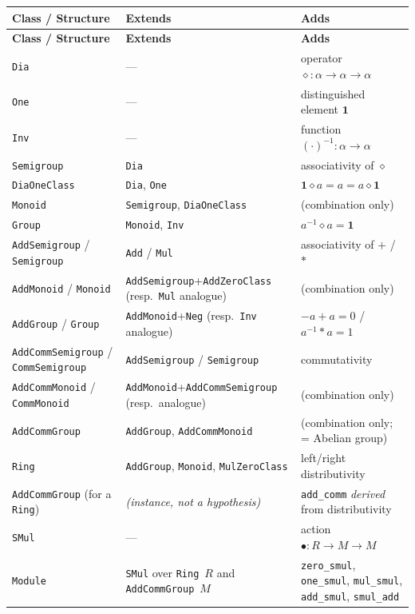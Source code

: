 \documentclass[11pt]{article}
\begin{document}
\begin{longtable}{@{}p{3.1cm}p{4.6cm}p{6.3cm}@{}}
\toprule
\textbf{Class / Structure} & \textbf{Extends} & \textbf{Adds} \\
\midrule
\endfirsthead
\toprule
\textbf{Class / Structure} & \textbf{Extends} & \textbf{Adds} \\
\midrule
\endhead
\texttt{Dia} & --- & operator $\diamond:\alpha\to\alpha\to\alpha$ \\
\texttt{One} & --- & distinguished element $\mathbf{1}$ \\
\texttt{Inv} & --- & function $(\cdot)^{-1}:\alpha\to\alpha$ \\
\texttt{Semigroup} & \texttt{Dia} & associativity of $\diamond$ \\
\texttt{DiaOneClass} & \texttt{Dia}, \texttt{One} & $\mathbf{1}\diamond a = a = a\diamond\mathbf{1}$ \\
\texttt{Monoid} & \texttt{Semigroup}, \texttt{DiaOneClass} & (combination only) \\
\texttt{Group} & \texttt{Monoid}, \texttt{Inv} & $a^{-1}\diamond a = \mathbf{1}$ \\
\midrule
\texttt{AddSemigroup} / \texttt{Semigroup} & \texttt{Add} / \texttt{Mul} & associativity of $+$ / $*$ \\
\texttt{AddMonoid} / \texttt{Monoid} & \texttt{AddSemigroup}+\texttt{AddZeroClass} (resp.\ \texttt{Mul} analogue) & (combination only) \\
\texttt{AddGroup} / \texttt{Group} & \texttt{AddMonoid}+\texttt{Neg} (resp.\ \texttt{Inv} analogue) & $-a+a=0$ / $a^{-1}*a=1$ \\
\texttt{AddCommSemigroup} / \texttt{CommSemigroup} & \texttt{AddSemigroup} / \texttt{Semigroup} & commutativity \\
\texttt{AddCommMonoid} / \texttt{CommMonoid} & \texttt{AddMonoid}+\texttt{AddCommSemigroup} (resp.\ analogue) & (combination only) \\
\texttt{AddCommGroup} & \texttt{AddGroup}, \texttt{AddCommMonoid} & (combination only; = Abelian group) \\
\midrule
\texttt{Ring} & \texttt{AddGroup}, \texttt{Monoid}, \texttt{MulZeroClass} & left/right distributivity \\
\texttt{AddCommGroup} (for a \texttt{Ring}) & \emph{(instance, not a hypothesis)} & \texttt{add\_comm} \emph{derived} from distributivity \\
\midrule
\texttt{SMul} & --- & action $\bullet:R\to M\to M$ \\
\texttt{Module} & \texttt{SMul} over \texttt{Ring}~$R$ and \texttt{AddCommGroup}~$M$ & \texttt{zero\_smul}, \texttt{one\_smul}, \texttt{mul\_smul}, \texttt{add\_smul}, \texttt{smul\_add} \\

\end{longtable}
\end{document}
